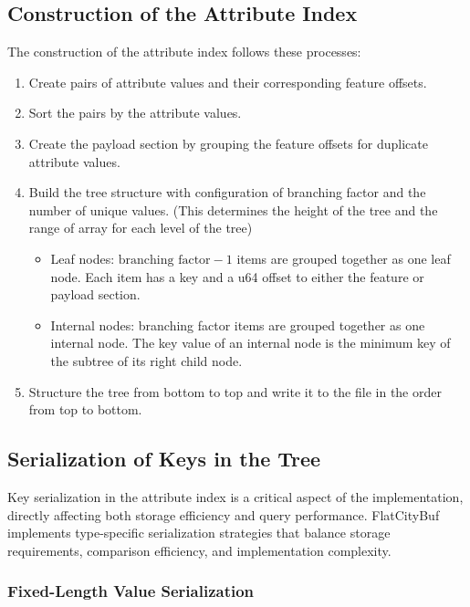 \subsection{Construction of the Attribute Index}
\label{methodology:attribute_index:construction}

The construction of the attribute index follows these processes:

\begin{enumerate}
  \item Create pairs of attribute values and their corresponding feature offsets.
  \item Sort the pairs by the attribute values.
  \item Create the payload section by grouping the feature offsets for duplicate attribute values.
  \item Build the tree structure with configuration of branching factor and the number of unique values. (This determines the height of the tree and the range of array for each level of the tree)
    \begin{itemize}
      \item Leaf nodes: $\text{branching factor} - 1$ items are grouped together as one leaf node. Each item has a key and a u64 offset to either the feature or payload section.
      \item Internal nodes: branching factor items are grouped together as one internal node. The key value of an internal node is the minimum key of the subtree of its right child node.
    \end{itemize}
  \item Structure the tree from bottom to top and write it to the file in the order from top to bottom.
\end{enumerate}

\subsection{Serialization of Keys in the Tree}
\label{methodology:attribute_index:key_serialization}

Key serialization in the attribute index is a critical aspect of the implementation, directly affecting both storage efficiency and query performance. FlatCityBuf implements type-specific serialization strategies that balance storage requirements, comparison efficiency, and implementation complexity.

\subsubsection{Fixed-Length Value Serialization}
\label{methodology:attribute_index:fixed_length_serialization}

